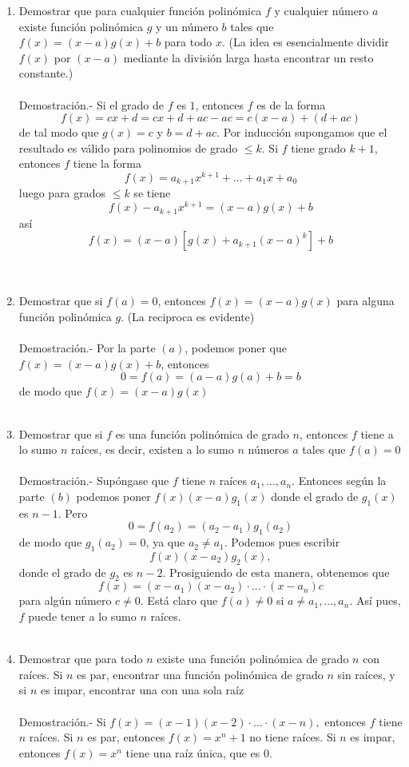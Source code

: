 \begin{enumerate}
\begin{enumerate}[\bfseries (a)]
	    \item Demostrar que para cualquier función polinómica $f$ y cualquier número $a$ existe función polinómica $g$ y un número $b$ tales que $f(x)=(x-a)g(x)+b$ para todo $x$. (La idea es esencialmente dividir $f(x)$ por $(x-a)$ mediante la división larga hasta encontrar un resto constante.)\\\\
	    Demostración.- \; Si el grado de $f$ es $1$, entonces $f$ es de la forma $$f(x)=cx+d=cx+d +ac-ac=c(x-a)+(d+ac)$$ de tal modo que $g(x)=c$ y $b=d+ac$. Por inducción supongamos que el resultado es válido para polinomios de grado $\leq k.$ Si $f$ tiene grado $k+1$, entonces $f$ tiene la forma $$f(x)=a_{k+1}x^{k+1} + ... + a_1x + a_0$$ luego para grados $\leq k$ se tiene $$f(x)-a_{k+1}x^{k+1} =(x-a)g(x)+b$$ así $$f(x) = (x-a)\left[g(x) + a_{k+1}(x-a)^k\right]+b$$\\\\

	    \item Demostrar que si $f(a)=0$, entonces $f(x)=(x-a)g(x)$ para alguna función polinómica $g$. (La reciproca es evidente)\\\\
	    Demostración.- \; Por la parte $(a)$, podemos poner que $f(x)=(x-a)g(x)+b$, entonces $$0=f(a)=(a-a)g(a)+b=b$$ de modo que $f(x)=(x-a)g(x)$\\\\

	    \item Demostrar que si $f$ es una función polinómica de grado $n$, entonces $f$ tiene a lo sumo $n$ raíces, es decir, existen a lo sumo $n$ números $a$ tales que $f(a)=0$\\\\
	    Demostración.- \; Supóngase que $f$ tiene $n$ raíces $a_1,...,a_n$. Entonces según la parte $(b)$ podemos poner $f(x)(x-a)g_1(x)$ donde el grado de $g_1(x)$ es $n-1$. Pero $$0=f(a_2)=(a_2-a_1)g_1(a_2)$$ de modo que $g_1(a_2)=0$, ya que $a_2 \neq a_1$. Podemos pues escribir $$f(x)(x-a_2)g_2(x),$$ donde el grado de $g_2$ es $n-2$. Prosiguiendo de esta manera, obtenemos que $$f(x)=(x-a_1)(x-a_2)\cdot ... \cdot (x-a_n)c$$ para algún número $c \neq 0.$ Está claro que $f(a)\neq 0$ si $a \neq a_1,...,a_n.$ Así pues, $f$ puede tener a lo sumo $n$ raíces.\\\\

	    \item Demostrar que para todo $n$ existe una función polinómica de grado $n$ con raíces. Si $n$ es par, encontrar una función polinómica de grado $n$ sin raíces, y si $n$ es impar, encontrar una con una sola raíz\\\\
	    Demostración.- \; Si $f(x)=(x-1)(x-2)\cdot ... \cdot (x-n),$ entonces $f$ tiene $n$ raíces. Si $n$ es par, entonces $f(x)=x^n + 1$ no tiene raíces. Si $n$ es impar, entonces $f(x)=x^n$ tiene una raíz única, que es $0.$\\\\


\end{enumerate}
\end{enumerate}

